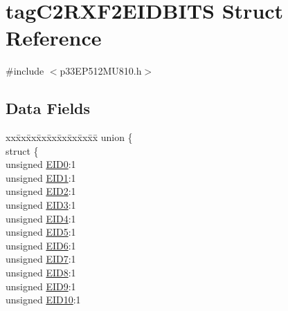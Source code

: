 \hypertarget{structtag_c2_r_x_f2_e_i_d_b_i_t_s}{}\section{tag\+C2\+R\+X\+F2\+E\+I\+D\+B\+I\+TS Struct Reference}
\label{structtag_c2_r_x_f2_e_i_d_b_i_t_s}


{\ttfamily \#include $<$p33\+E\+P512\+M\+U810.\+h$>$}

\subsection*{Data Fields}
\begin{DoxyCompactItemize}
\item 
\begin{tabbing}
xx\=xx\=xx\=xx\=xx\=xx\=xx\=xx\=xx\=\kill
union \{\\
\>struct \{\\
\>\>unsigned \hyperlink{structtag_c2_r_x_f2_e_i_d_b_i_t_s_a9da8b7b30247e4f9cd8cc056549aa9fd}{EID0}:1\\
\>\>unsigned \hyperlink{structtag_c2_r_x_f2_e_i_d_b_i_t_s_afd6c139491d147c1262f3d051c6691e9}{EID1}:1\\
\>\>unsigned \hyperlink{structtag_c2_r_x_f2_e_i_d_b_i_t_s_a36ec62d8d3c5acd5d15e6691dc099a94}{EID2}:1\\
\>\>unsigned \hyperlink{structtag_c2_r_x_f2_e_i_d_b_i_t_s_ab895f7d0ac289a0383b607cbc62eebe2}{EID3}:1\\
\>\>unsigned \hyperlink{structtag_c2_r_x_f2_e_i_d_b_i_t_s_a136d5a709d6618d40acceccb43036656}{EID4}:1\\
\>\>unsigned \hyperlink{structtag_c2_r_x_f2_e_i_d_b_i_t_s_a8dffb2d86a6c184df505ae7c71a58710}{EID5}:1\\
\>\>unsigned \hyperlink{structtag_c2_r_x_f2_e_i_d_b_i_t_s_af8a8574102515d8f1a4b7fd1685d0532}{EID6}:1\\
\>\>unsigned \hyperlink{structtag_c2_r_x_f2_e_i_d_b_i_t_s_a84c3262e67f8d5fd387ac10bde6fa9b1}{EID7}:1\\
\>\>unsigned \hyperlink{structtag_c2_r_x_f2_e_i_d_b_i_t_s_acca25e0b7d86eb499d01f85222baea87}{EID8}:1\\
\>\>unsigned \hyperlink{structtag_c2_r_x_f2_e_i_d_b_i_t_s_ac6748f73d4ada8538b06548be4f396c2}{EID9}:1\\
\>\>unsigned \hyperlink{structtag_c2_r_x_f2_e_i_d_b_i_t_s_a9cea8e77ecbb72bd3b08102412793725}{EID10}:1\\

\end{tabbing}
\end{DoxyCompactItemize}
